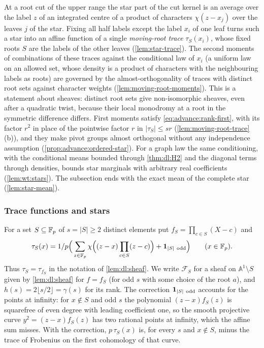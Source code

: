 At a root cut of the upper range the star part of the cut kernel is an average
over the label $z$ of an integrated centre of a product of characters
$\chi(z-x_j)$ over the leaves $j$ of the star. Fixing all half labels except
the label $x_i$ of one leaf turns such a star into an affine function of a
single \emph{moving-root trace} $\tau_S(x_i)$, whose fixed roots $S$ are the
labels of the other leaves (\cref{lem:star-trace}). The second moments of
combinations of these traces against the conditional law of $x_i$ (a
uniform law on an allowed set, whose density is a product of characters with
the neighbouring labels as roots) are governed by the almost-orthogonality of
traces with distinct root sets against character weights
(\cref{lem:moving-root-moments}). This is a statement about sheaves: distinct
root sets give non-isomorphic sheaves, even after a quadratic twist, because
their local monodromy at a root in the symmetric difference differs. First moments satisfy \eqref{eq:advance:rank-first}, with its factor $r^2$ in place of the pointwise factor $r$ in $|\tau_S|\le sr$ (\cref{lem:moving-root-trace}(b)), and they make pivot groups almost
orthogonal without any independence assumption
(\cref{prop:advance:ordered-star}). For a graph law the same conditioning,
with the conditional means bounded through \cref{thm:dl:H2} and the diagonal
terms through densities, bounds star marginals with arbitrary real
coefficients (\cref{lem:wt:stars}). The subsection ends with the exact mean of
the complete star (\cref{lem:star-mean}).

\subsubsection{Trace functions and stars}\label{subsec:advance:conditional-star}

For a set $S\subseteq\mathbb F_p$ of $s=|S|\ge2$ distinct elements put
$f_S=\prod_{c\in S}(X-c)$ and
\begin{equation}\label{eq:moving-root-tau}
  \tau_S(x)=1/p\Big(\sum_{z\in\mathbb F_p}\chi\Big((z-x)\prod_{c\in S}(z-c)\Big)
  +\mathbf 1_{|S|\ \rm odd}\Big)\qquad(x\in\mathbb F_p).
\end{equation}
Thus $\tau_S=\tau_{f_S}$ in the notation of \cref{lem:dl:sheaf}. We write
$\mathcal F_S$ for a sheaf on $\mathbb A^1\setminus S$ given by
\cref{lem:dl:sheaf} for $f=f_S$ (for odd $s$ with some choice of the root $a$),
and $h(s)=2\lfloor s/2\rfloor=\gamma(s)$ for its rank. The correction
$\mathbf 1_{|S|\ \rm odd}$ accounts for the points at infinity: for
$x\notin S$ and odd $s$ the polynomial $(z-x)f_S(z)$ is squarefree of even
degree with leading coefficient one, so the smooth projective curve
$y^2=(z-x)f_S(z)$ has two rational points at infinity, which the affine sum
misses. With the correction, $p\,\tau_S(x)$ is, for every $s$ and $x\notin S$,
minus the trace of Frobenius on the first cohomology of that curve.

